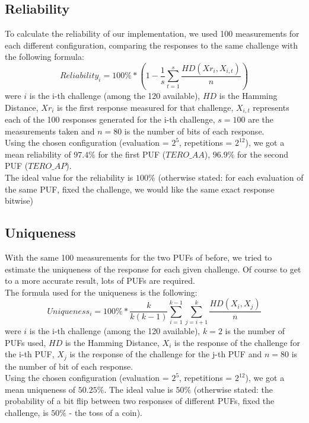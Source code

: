 \subsection{Reliability}

To calculate the reliability of our implementation, we used 100 measurements for each different configuration,
comparing the responses to the same challenge with the following formula:
\begin{equation}
    Reliability_i = 100\% * (1 - \frac{1}{s} \sum_{t=1}^{s} \frac{HD(Xr_i, X_{i,t})}{n})
\end{equation}
were $ i $ is the i-th challenge (among the 120 available), $ HD $ is the Hamming Distance, $ Xr_i $ is the first response measured 
for that challenge, $ X_{i,t} $ represents each of the 100 responses generated for the i-th challenge, $s=100$ are the measurements taken
and $n=80$ is the number of bits of each response. \\

Using the chosen configuration (evaluation = $ 2^5 $, repetitions = $ 2^{12} $), we got a mean reliability 
of $ 97.4\% $ for the first PUF ($TERO\_AA$), $ 96.9\% $ for the second PUF ($TERO\_AP$). \\
The ideal value for the reliability is $100\%$ (otherwise stated: for each evaluation of the same PUF, fixed the challenge, we would like the same exact response bitwise)

\subsection{Uniqueness}
With the same 100 measurements for the two PUFs of before, we tried to estimate the uniqueness of the response for each given challenge.
Of course to get to a more accurate result, lots of PUFs are required. \\
The formula used for the uniqueness is the following:
\begin{equation}
    Uniqueness_i = 100\% * \frac{k}{k(k-1)} \sum_{i=1}^{k-1}\sum_{j=i+1}^{k} \frac{HD(X_i,X_j)}{n}
\end{equation}
were $ i $ is the i-th challenge (among the 120 available), $k=2$ is the number of PUFs used, $ HD $ is the Hamming Distance, $ X_i $ is the response of the challenge 
for the i-th PUF, $ X_j $ is the response of the challenge for the j-th PUF and $n=80$ is the number of bit of each response. \\

Using the chosen configuration (evaluation = $ 2^5 $, repetitions = $ 2^{12} $), we got a mean uniqueness of $50.25\%$.
The ideal value is $50\%$ (otherwise stated: the probability of a bit flip between two responses of different PUFs, fixed the challenge, is $50\%$ - the toss of a coin).

